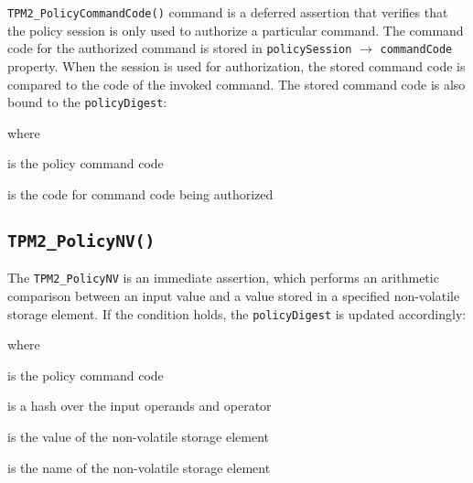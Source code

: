 \documentclass{sig-alternate-2013}
\begin{document}
\texttt{TPM2\_PolicyCommandCode()} command is a deferred assertion that verifies
that the policy session is only used to authorize a particular command. The
command code for the authorized command is stored in \texttt{policySession}
$\rightarrow$ \texttt{commandCode} property. When the session is used for
authorization, the stored command code is compared to the code of the invoked
command. The stored command code is also bound to the \texttt{policyDigest}:

\vspace{.5\baselineskip}
\noindent
{}

\vspace{.5\baselineskip}
\noindent where

\begin{description}
  \small
  \item[$TPM\_CC\_PolicyCommandCode$] \hfill is the policy command code
  \item[$code$]  \hfill is the code for command code being authorized
\end{description}



\subsection{\texttt{TPM2\_PolicyNV()}}

The \texttt{TPM2\_PolicyNV} is an immediate assertion, which performs an
arithmetic comparison between an input value and a value stored in a specified
non-volatile storage element. If the condition holds, the \texttt{policyDigest}
is updated accordingly:

\vspace{.5\baselineskip}
\noindent
{}

\vspace{.5\baselineskip}
\noindent where

\begin{description}
  \small
  \item[$TPM\_CC\_PolicyNV$]  \hfill is the policy command code
  \item[$args$]    \hfill is a hash over the input operands and operator
  \item[$NVValue$] \hfill is the value of the non-volatile storage element
  \item[$NVName$]  \hfill is the name of the non-volatile storage element
\end{description}
\end{document}
